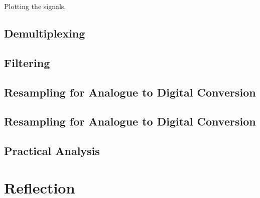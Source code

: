 \documentclass[12pt]{article}
\begin{document}
Plotting the signals,

\subsection*{Demultiplexing}
\subsection*{Filtering}
\subsection*{Resampling for Analogue to Digital Conversion}
\subsection*{Resampling for Analogue to Digital Conversion}
\subsection*{Practical Analysis}

\section{Reflection}
\end{document}
